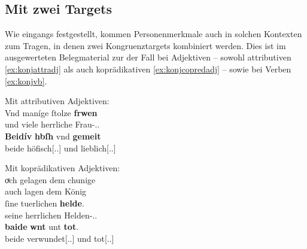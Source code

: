 \subsection{Mit zwei Targets}
\label{subsec:beidkoordtarg}

Wie eingangs festgestellt, kommen Personenmerkmale auch in solchen Kontexten
zum Tragen, in denen zwei Kongruenztargets kombiniert werden. Dies ist im
ausgewerteten Belegmaterial zur \citet{kc} der Fall bei Adjektiven --
sowohl attributiven \cref{ex:konjattradj} als auch koprädikativen
\cref{ex:konjcopredadj} -- sowie bei Verben \cref{ex:konjvb}.

\begin{exe}
\ex \begin{xlist}
	\ex \label{ex:konjattradj}
		Mit attributiven Adjektiven:\\
		\gll Vnd maníge ſtolze \textbf{frwen} \\
			und viele herrliche Frau-\Nom.\Pl.\FemF{} \\
	\sn \gll \textbf{Beidív} \textbf{hbſh} vnd \textbf{gemeit} \\
			beide höfisch[\Nom.\Pl.\FemF] und lieblich[\Nom.\Pl.\FemF] \\
		\begin{taggedline}{\parencites[\pno~21\va, 21--22]{kc:VB}[zu][4351--4352]{schroeder1895}}
			\trans {}
		\end{taggedline}


	\ex \label{ex:konjcopredadj}
		Mit koprädikativen Adjektiven:\\
		\gll oͮch gelagen dem chunige \\
			auch lagen dem König \\
	\sn \gll ſine tuerlichen \textbf{helde}. \\
			seine herrlichen Helden-\Nom.\Pl.\MascM{} \\
	\sn \gll \textbf{baide} \textbf{wnt} unt \textbf{tot}. \\
			beide verwundet[\Nom.\Pl.\MascM] und tot[\Nom.\Pl.\MascM] \\
		\begin{taggedline}{\parencites[\pno~67\vb, 34--36]{kc:A1}[vgl.][15880--15883]{schroeder1895}}
			\trans {}
		\end{taggedline}


\end{xlist}
\end{exe}
